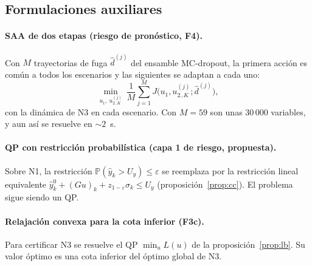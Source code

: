 \subsection{Formulaciones auxiliares}
\paragraph{SAA de dos etapas (riesgo de pronóstico, F4).} Con $M$ trayectorias de fuga
$\hat d^{(j)}$ del ensamble MC-dropout, la primera acción es común a todos los escenarios y
las siguientes se adaptan a cada uno:
\[
\min_{u_1,\ u^{(j)}_{2..K}}\ \frac1M\sum_{j=1}^{M}J\big(u_1,u^{(j)}_{2..K};\hat d^{(j)}\big),
\]
con la dinámica de N3 en cada escenario. Con $M=59$ son unas 30\,000 variables, y aun así se
resuelve en $\sim2$~s.

\paragraph{QP con restricción probabilística (capa 1 de riesgo, propuesta).} Sobre N1, la
restricción $\mathbb P(\hat y_k>U_y)\le\varepsilon$ se reemplaza por la restricción lineal
equivalente $\hat y^0_k+(Gu)_k+z_{1-\varepsilon}\sigma_k\le U_y$
(proposición~\ref{prop:cc}). El problema sigue siendo un QP.

\paragraph{Relajación convexa para la cota inferior (F3c).} Para certificar N3 se resuelve
el QP $\min_u L(u)$ de la proposición~\ref{prop:lb}. Su valor óptimo es una cota inferior del
óptimo global de N3.

